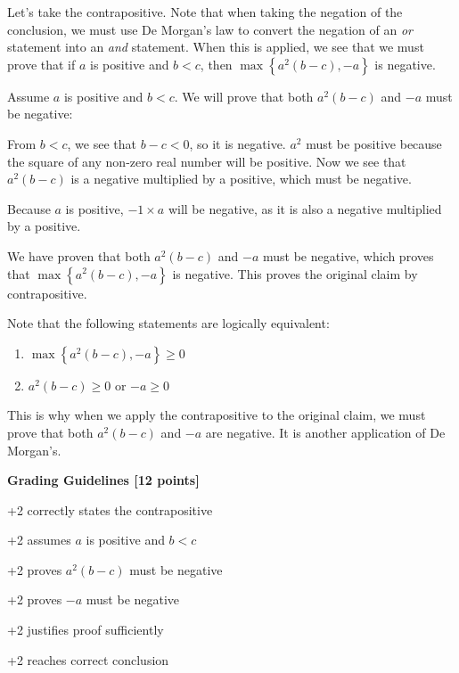 \documentclass[12pt]{exam}
\begin{document}
\begin{solution}
    Let's take the contrapositive. Note that when taking the negation of the conclusion, we must use De Morgan's law to convert the negation of an \textit{or} statement into an \textit{and} statement. When this is applied, we see that we must prove that if $a$ is positive and $b<c$, then $\max\left \{a^2(b-c), -a\right \}$ is negative.
    
    Assume $a$ is positive and $b<c$. We will prove that both $a^2(b-c)$ and $-a$ must be negative:
    \begin{stmts}
        \item From $b<c$, we see that $b-c<0$, so it is negative. $a^2$ must be positive because the square of any non-zero real number will be positive. Now we see that $a^2(b-c)$ is a negative multiplied by a positive, which must be negative.
        
        \item Because $a$ is positive, $-1\times a$ will be negative, as it is also a negative multiplied by a positive. 
    \end{stmts}
    We have proven that both $a^2(b-c)$ and $-a$ must be negative, which proves that $\max\left \{a^2(b-c), -a\right \}$ is negative. This proves the original claim by contrapositive.
    
    Note that the following statements are logically equivalent:
    \begin{enumerate}
        \item $\max\left \{a^2(b-c), -a\right \}\geq 0$
        \item $a^2(b-c)\geq0$ or $-a\geq0$
    \end{enumerate}
    This is why when we apply the contrapositive to the original claim, we must prove that both $a^2(b-c)$ and $-a$ are negative. It is another application of De Morgan's.

    \textbf{Grading Guidelines [12 points]}
    \begin{guidelines}
        \item +2 correctly states the contrapositive
        \item +2 assumes $a$ is positive and $b<c$
        \item +2 proves $a^2(b-c)$ must be negative 
        \item +2 proves $-a$ must be negative
        \item +2 justifies proof sufficiently
        \item +2 reaches correct conclusion
    \end{guidelines}
\end{solution}
\end{document}
